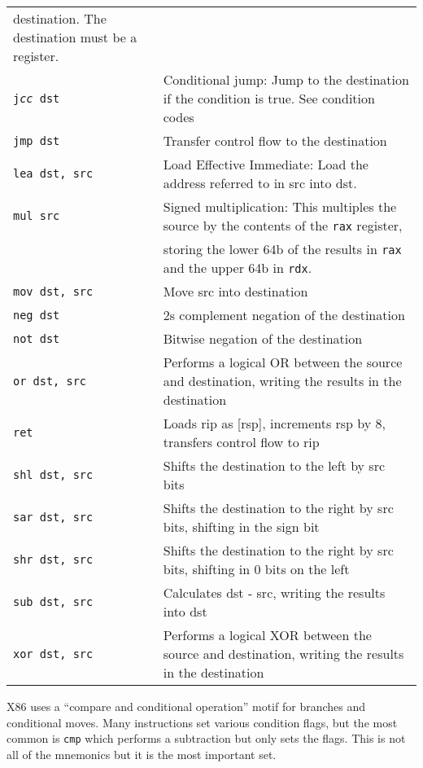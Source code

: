 \begin{tabular}{l|l}
destination. The destination must be a register. \\
\tt j{\it cc} dst & Conditional jump: Jump to the destination if the condition
is true. See condition codes \\ 
\tt jmp dst & Transfer control flow to the destination \\
\tt lea dst, src & Load Effective Immediate: Load the address referred to
in src into dst. \\
\tt mul src & Signed multiplication: This multiples the source by the
contents of the {\tt rax} register, \\ & storing the lower 64b of the
results in {\tt rax} and the upper 64b in {\tt rdx}. \\
\tt mov dst, src & Move src into destination \\
\tt neg dst & 2s complement negation of the destination \\
\tt not dst & Bitwise negation of the destination \\
\tt or dst, src & Performs a logical OR between the source and
destination, writing the results in the destination \\
\tt ret & Loads rip as [rsp], increments rsp by 8, transfers
control flow to rip \\ 
\tt shl dst, src & Shifts the destination to the left by src bits \\
\tt sar dst, src & Shifts the destination to the right by src bits, shifting in
the sign bit \\ 
\tt shr dst, src & Shifts the destination to the right by src bits, shifting in 0
bits on the left \\
\tt sub dst, src & Calculates dst - src, writing the results into dst \\
\tt xor dst, src & Performs a logical XOR between the source and
destination, writing the results in the destination \\ \hline
\end{tabular}

\vspace{.2in} X86 uses a ``compare and conditional operation'' motif
for branches and conditional moves.  Many instructions set various
condition flags, but the most common is {\tt cmp} which performs a
subtraction but only sets the flags.  This is not all of the mnemonics
but it is the most important set.

